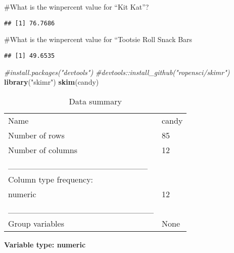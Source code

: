 \documentclass[
]{article}
\newenvironment{Shaded}{\begin{snugshade}}{\end{snugshade}}
\newcommand{\CommentTok}[1]{\textcolor[rgb]{0.56,0.35,0.01}{\textit{#1}}}
\newcommand{\KeywordTok}[1]{\textcolor[rgb]{0.13,0.29,0.53}{\textbf{#1}}}
\newcommand{\NormalTok}[1]{#1}
\newcommand{\OperatorTok}[1]{\textcolor[rgb]{0.81,0.36,0.00}{\textbf{#1}}}
\newcommand{\StringTok}[1]{\textcolor[rgb]{0.31,0.60,0.02}{#1}}
\begin{document}
\#What is the winpercent value for ``Kit Kat''?

\begin{Shaded}
\end{Shaded}

\begin{verbatim}
## [1] 76.7686
\end{verbatim}

\#What is the winpercent value for ``Tootsie Roll Snack Bars

\begin{Shaded}
\end{Shaded}

\begin{verbatim}
## [1] 49.6535
\end{verbatim}

\begin{Shaded}
\begin{Highlighting}[]
\CommentTok{#install.packages("devtools") }
\CommentTok{#devtools::install_github("ropensci/skimr")}
\KeywordTok{library}\NormalTok{(}\StringTok{"skimr"}\NormalTok{)}
\KeywordTok{skim}\NormalTok{(candy)}
\end{Highlighting}
\end{Shaded}

\begin{longtable}[]{@{}ll@{}}
\caption{Data summary}\tabularnewline
\toprule
\endhead
Name & candy\tabularnewline
Number of rows & 85\tabularnewline
Number of columns & 12\tabularnewline
\_\_\_\_\_\_\_\_\_\_\_\_\_\_\_\_\_\_\_\_\_\_\_ &\tabularnewline
Column type frequency: &\tabularnewline
numeric & 12\tabularnewline
\_\_\_\_\_\_\_\_\_\_\_\_\_\_\_\_\_\_\_\_\_\_\_\_ &\tabularnewline
Group variables & None\tabularnewline
\bottomrule
\end{longtable}

\textbf{Variable type: numeric}
\end{document}

